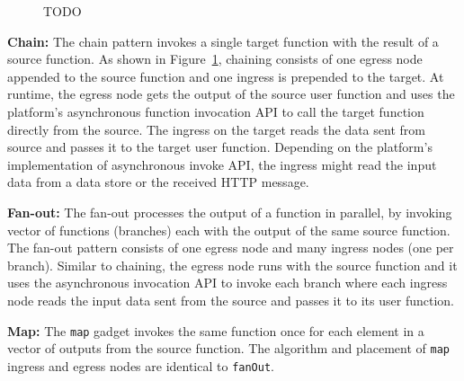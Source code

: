  \begin{figure}[t!]
 	\centering
 	\caption{TODO}
 	\label{fig:transition}
 \end{figure}

\noindent\textbf{Chain:}
The chain pattern invokes a single target function with the result of a source function.
As shown in Figure~\ref{fig:transition}, chaining consists of one egress node 
appended to the source function and one ingress is prepended to the target.
At runtime, the egress node gets the output of the source user function
and uses the platform's asynchronous function invocation API to call the
target function directly from the source. The ingress on the target reads the
data sent from source and passes it to the target user function. Depending on
the platform's implementation of asynchronous invoke API, the ingress might
read the input data from a data store or the received HTTP message.


\noindent\textbf{Fan-out:}
The fan-out processes the output of a function  in parallel, by 
invoking vector of functions (branches) each with the output of the same
source function. The fan-out pattern consists of one egress node and many ingress
nodes (one per branch). Similar to chaining, the egress node runs with the
source function and it uses the asynchronous invocation API to invoke each
branch where each ingress node 
reads the input data sent from the source and passes it to its user function.


\noindent \textbf{Map:}
The \texttt{map} gadget invokes the same
function once for each element in a vector of outputs from the source
function. The algorithm and placement of \texttt{map} ingress and egress nodes
are identical to \texttt{fanOut}. 



